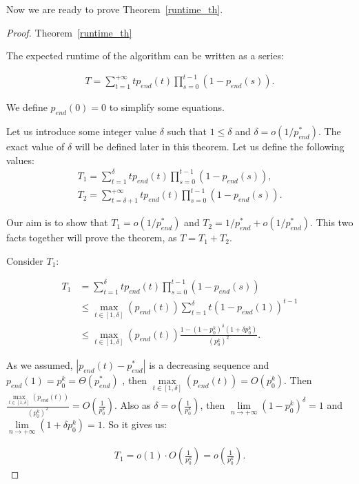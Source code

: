 \documentclass{article}
\begin{document}
Now we are ready to prove Theorem~\ref{runtime_th}.

\begin{proof}{Theorem~\ref{runtime_th}}

The expected runtime of the algorithm can be written as a series:

\begin{align*}
  T = \sum\limits_{t = 1}^{+\infty} t p_{end}(t) \prod\limits_{s = 0}^{t - 1} (1 - p_{end}(s)).
\end{align*}

We define $p_{end}(0) = 0$ to simplify some equations.

Let us introduce some integer value $\delta$ such that $1 \le \delta$ and $\delta = o(1/p_{end}^*)$. The exact value of $\delta$ will be defined later in this theorem. Let us define the following values:
\begin{align*}
  T_1 = \sum\limits_{t = 1}^{\delta} t p_{end}(t) \prod\limits_{s = 0}^{t - 1} (1 - p_{end}(s)), \\
  T_2 = \sum\limits_{t = \delta + 1}^{+\infty} t p_{end}(t) \prod\limits_{s = 0}^{t - 1} (1 - p_{end}(s)).
\end{align*}

Our aim is to show that $T_1 = o(1/p_{end}^*)$ and $T_2 = 1/p_{end}^* + o(1/p_{end}^*).$ This two facts together will prove the theorem, as $T = T_1 + T_2$.

Consider $T_1$:

\begin{align*}
  T_1 &=  \sum\limits_{t = 1}^{\delta} t p_{end}(t) \prod\limits_{s = 0}^{t - 1} (1 - p_{end}(s)) \\
  &\le \max\limits_{t \in [1, \delta]}(p_{end}(t)) \sum\limits_{t = 1}^{\delta} t (1 - p_{end}(1))^{t - 1} \\
  &\le \max\limits_{t \in [1, \delta]}(p_{end}(t))  \frac{1 - (1 - p_0^k)^\delta(1 + \delta p_0^k)}{(p_0^k)^2}.
\end{align*}

As we assumed, $|p_{end}(t) - p_{end}^*|$ is a decreasing sequence and $p_{end}(1) = p_0^k = \Theta(p_{end}^*)$ , then $\max\limits_{t \in [1, \delta]}(p_{end}(t)) = O(p_0^k)$. Then $\frac{\max\limits_{t \in [1, \delta]}(p_{end}(t))}{(p_0^k)^2} = O(\frac{1}{p_0^k})$.
Also as $\delta = o(\frac{1}{p_0^k})$, then $\lim\limits_{n \to + \infty} (1 - p_0^k)^\delta = 1$ and $\lim\limits_{n \to + \infty} (1 + \delta p_0^k) = 1$. So it gives us:

\begin{align*}
  T_1 = o(1) \cdot O\left(\frac{1}{p_0^k}\right) = o\left(\frac{1}{p_0^k}\right).
\end{align*}


\end{proof}
\end{document}
